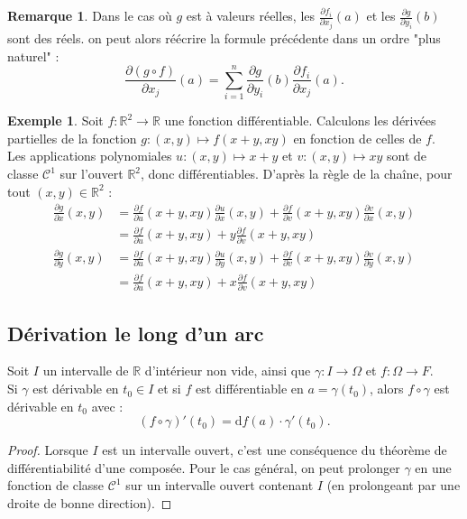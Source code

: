 \documentclass[french]{article}
\newcommand{\R}{\mathbb{R}}
\renewcommand{\d}{\text{d}}
\theoremstyle{plain}
\theoremstyle{definition}
\newtheorem*{ex}{Exemple}
\newtheorem*{rmq}{Remarque}
\theoremstyle{remark}
\begin{document}
\begin{rmq}
	Dans le cas où $g$ est à valeurs réelles, les $\displaystyle\frac{\partial f_i}{\partial x_j}(a)$ et les $\displaystyle\frac{\partial g}{\partial y_i}(b)$ sont des réels. on peut alors réécrire la formule précédente dans un ordre "plus naturel" :
	$$\frac{\partial (g\circ f)}{\partial x_j}(a)=\sum_{i=1}^{n}\frac{\partial g}{\partial y_i}(b)\frac{\partial f_i}{\partial x_j}(a).$$
\end{rmq}

\begin{ex}
	Soit $f:\R^2\to\R$ une fonction différentiable. Calculons les dérivées partielles de la fonction $g:(x,y)\mapsto f(x+y,xy)$ en fonction de celles de $f$.\\
	Les applications polynomiales $u:(x,y)\mapsto x+y$ et $v:(x,y)\mapsto xy$ sont de classe $\mathcal{C}^1$ sur l'ouvert $\R^2$, donc différentiables. D'après la règle de la chaîne, pour tout $(x,y)\in\R^2$ :
	\begin{align*}
		\frac{\partial g}{\partial x}(x,y)&=\frac{\partial f}{\partial u}(x+y,xy)\frac{\partial u}{\partial x}(x,y)+\frac{\partial f}{\partial v}(x+y,xy)\frac{\partial v}{\partial x}(x,y)\\[2mm]
		&=\frac{\partial f}{\partial u}(x+y,xy)+y\frac{\partial f}{\partial v}(x+y,xy)\\[2mm]
		\frac{\partial g}{\partial y}(x,y)&=\frac{\partial f}{\partial u}(x+y,xy)\frac{\partial u}{\partial y}(x,y)+\frac{\partial f}{\partial v}(x+y,xy)\frac{\partial v}{\partial y}(x,y)\\[2mm]
		&=\frac{\partial f}{\partial u}(x+y,xy)+x\frac{\partial f}{\partial v}(x+y,xy)
	\end{align*}
\end{ex}

\subsection{Dérivation le long d'un arc}

\begin{prop}%
	Soit $I$ un intervalle de $\R$ d'intérieur non vide, ainsi que $\gamma:I\to\Omega$ et $f:\Omega\to F$.\\
	Si $\gamma$ est dérivable en $t_0\in I$ et si $f$ est différentiable en $a=\gamma(t_0)$, alors $f\circ\gamma$ est dérivable en $t_0$ avec :
	$$(f\circ \gamma)'(t_0)=\d f(a)\cdot\gamma'(t_0).$$
\end{prop}

\begin{proof}
	Lorsque $I$ est un intervalle ouvert, c'est une conséquence du théorème de différentiabilité d'une composée. Pour le cas général, on peut prolonger $\gamma$ en une fonction de classe $\mathcal{C}^1$ sur un intervalle ouvert contenant $I$ (en prolongeant par une droite de bonne direction).
\end{proof}
\end{document}
